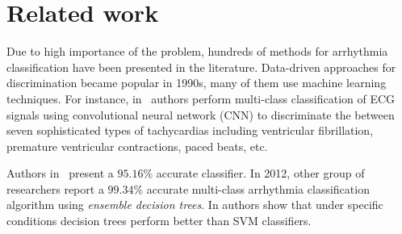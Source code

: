 \section{Related work}
\label{sec:related}

Due to high importance of the problem, hundreds of methods for 
arrhythmia classification have been presented in the literature. 
Data-driven approaches for discrimination became popular in 1990s, 
many of them use machine learning techniques. 
For instance, in~\cite{jun2018ecg} authors perform multi-class 
classification of 
ECG signals using convolutional neural network (CNN) to discriminate 
the between seven sophisticated types of tachycardias including 
ventricular fibrillation, premature ventricular contractions, paced 
beats, etc.

Authors in~\cite{assadi2015arrhythmias} present a $95.16\%$ accurate 
\knn classifier.
In 2012, other group of researchers report a $99.34\%$ accurate 
multi-class arrhythmia classification algorithm using 
\textit{ensemble decision trees}. 
In \cite{mohanty2018ventricular} authors show that under specific 
conditions decision trees perform better than SVM classifiers.  







